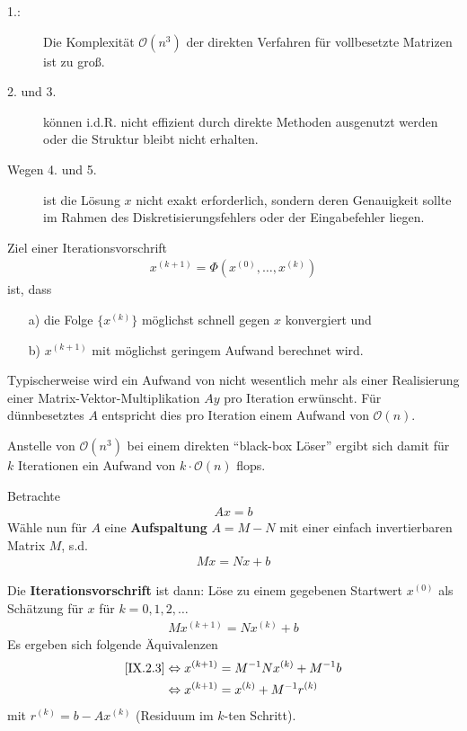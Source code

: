 \label{9.1.3}
\begin{description}
  \item[1.:] Die Komplexität $\mathcal{O}(n^3)$ der direkten
   Verfahren für vollbesetzte Matrizen ist zu groß.
  \item[2. und 3.] können i.d.R. nicht effizient durch direkte Methoden
   ausgenutzt werden oder die Struktur bleibt nicht erhalten.
  \item [Wegen 4. und 5.] ist die Lösung $x$ nicht exakt erforderlich,
    sondern deren Genauigkeit sollte im Rahmen des
    Diskretisierungsfehlers oder der Eingabefehler liegen.
\end{description}

\begin{Beme}\label{9.1.4}
Ziel einer Iterationsvorschrift
\begin{gather*}
  x^{(k+1)} = \Phi (x^{(0)}, \dotsc, x^{(k)} )
\end{gather*}
ist, dass
\begin{enumerate}
  \item[a)] die Folge $\{x^{(k)}\}$ möglichst schnell gegen $x$
  konvergiert und
  \item[b)] $x^{(k+1)}$ mit möglichst geringem Aufwand berechnet
  wird.
\end{enumerate}

Typischerweise wird ein Aufwand von nicht
  wesentlich mehr als einer Realisierung einer 
Matrix-Vektor-Multiplikation $Ay$
  pro Iteration erwünscht.  Für dünnbesetztes $A$ entspricht
  dies pro Iteration einem Aufwand von $\mathcal{O}(n)$.

  Anstelle von $\mathcal{O}(n^3)$  bei einem direkten 
  \enquote{black-box Löser} ergibt sich damit für $k$
    Iterationen ein Aufwand von $k \cdot \mathcal{O}(n)$ flops.
\end{Beme}

Betrachte
\begin{gather}
  Ax=b
  \label{IX.2.1}
\end{gather}
Wähle nun für $A$ eine \textbf{Aufspaltung} $A=M-N$
mit einer einfach invertierbaren Matrix $M$, s.d.
\begin{gather}
  Mx = Nx +b \label{IX.2.2}
\end{gather}

Die \textbf{Iterationsvorschrift} ist dann: 
Löse zu einem gegebenen Startwert $x^{(0)}$ als Schätzung für $x$
für $k=0,1,2, \dotsc$
\begin{gather}
  Mx^{(k+1)}= Nx^{(k)} +b \label{IX.2.3}
\end{gather}
Es ergeben sich folgende Äquivalenzen
\begin{align}
  \eqref{IX.2.3} &\Leftrightarrow
                   x^{(k+1)} = M^{-1}Nx^{(k)}+M^{-1}b 
                   \label{IX.2.4}\\
                 &\Leftrightarrow x^{(k+1)} = x^{(k)} + M^{-1}r^{(k)}
                   \label{IX.2.5}
\end{align}
mit $r^{(k)}= b-Ax^{(k)}$ (Residuum im $k$-ten Schritt).

